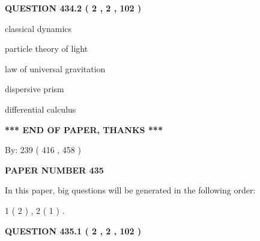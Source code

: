 \documentclass[12pt]{article}
\begin{document}
 
 
 
  
\vspace{0.2in}
  
{\textbf{\Large{QUESTION
434.2 
 ( 2 , 2 , 102 )
}}}
  
  
 
 
\noindent{}
 
 
classical dynamics
 
 
particle theory of light
 
 
law of universal gravitation
 
 
dispersive prism
 
 
differential calculus
 
 
 
 
   
   
\vspace{1.0in} 
{\textbf{\large{ *** END OF PAPER, THANKS *** }}} 
   
   
\hspace{1.0in} By: 
 239 ( 416 ,  458 )
   
   
   
   
\newpage 
\setcounter{page}{ 
   435001 } 
   
   
   
   
 {\textbf{ \Large{ PAPER NUMBER  435  }}}
   
   
\vspace{0.2in}
   
   
   
   
   
\vspace{0.2in}
   
In this paper, big questions will be generated in the following order: 
   
   
   1 ( 2 )
 ,
   2 ( 1 )
 .
  
\vspace{0.2in}
  
{\textbf{\Large{QUESTION
435.1 
 ( 2 , 2 , 102 )
}}}
  
  
 
 
\noindent{}
 
\end{document}
